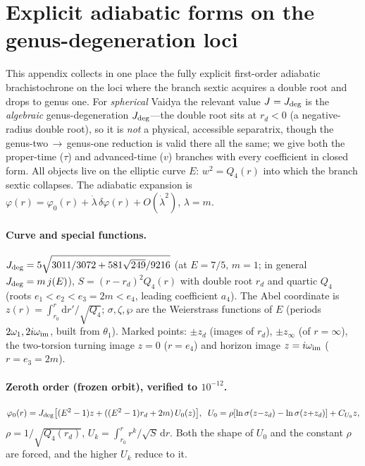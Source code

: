 \documentclass[12pt]{iopart}
\newcommand{\Jc}{J_{\rm deg}}
\newcommand{\dd}{\mathrm{d}}
\theoremstyle{plain}
\theoremstyle{definition}
\theoremstyle{plain}
\theoremstyle{remark}
\begin{document}
\section{Explicit adiabatic forms on the genus-degeneration loci}
\label{app:degeneration}
This appendix collects in one place the fully explicit first-order adiabatic
brachistochrone on the loci where the branch sextic acquires a double root and drops to
genus one. For \emph{spherical} Vaidya the relevant value $J=\Jc$ is the \emph{algebraic}
genus-degeneration $J_{\rm deg}$---the double root sits at $r_d<0$
(a negative-radius double root), so it is \emph{not} a physical, accessible separatrix,
though the genus-two$\,\to\,$genus-one reduction is valid there all the same; we give both
the proper-time ($\tau$) and advanced-time ($v$) branches with every coefficient in closed
form. All objects live on
the elliptic curve $E:\,w^2=Q_4(r)$ into which the branch sextic collapses. The adiabatic expansion is
$\varphi(r)=\varphi_0(r)+\dot\lambda\,\delta\varphi(r)+O(\dot\lambda^2)$, $\lambda=m$.

\paragraph{Curve and special functions.}
$\Jc=5\sqrt{3011/3072+581\sqrt{249}/9216}$ (at $E=7/5,\,m=1$; in general $\Jc=m\,j(E)$),
$S=(r-r_d)^2Q_4(r)$ with double root $r_d$ and quartic $Q_4$ (roots
$e_1<e_2<e_3=2m<e_4$, leading coefficient $a_4$). The Abel coordinate is
$z(r)=\int_{r_0}^r\dd r'/\sqrt{Q_4}$; $\sigma,\zeta,\wp$ are the Weierstrass functions
of $E$ (periods $2\omega_1,2i\omega_{\rm im}$, built from $\theta_1$). Marked points:
$\pm z_d$ (images of $r_d$), $\pm z_\infty$ (of $r=\infty$), the two-torsion turning
image $z=0$ ($r=e_4$) and horizon image $z=i\omega_{\rm im}$ ($r=e_3=2m$).

\paragraph{Zeroth order (frozen orbit), verified to $10^{-12}$.}
\begin{equation}
\varphi_0(r)=\Jc\big[(E^2-1)z+((E^2-1)r_d+2m)\,U_0(z)\big],\;\;
U_0=\rho[\ln\sigma(z{-}z_d)-\ln\sigma(z{+}z_d)]+C_{U_0}z,
\end{equation}
$\rho=1/\sqrt{Q_4(r_d)}$, $U_k=\int_{r_0}^r r^k/\sqrt S\,\dd r$. Both the shape of $U_0$
and the constant $\rho$ are forced, and the higher $U_k$ reduce to it.
\end{document}
